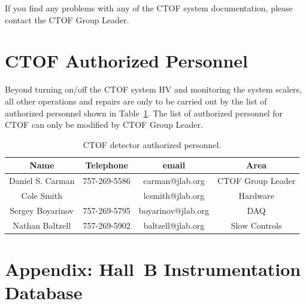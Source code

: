 \documentclass[12pt]{article}
\begin{document}
If you find any problems with any of the CTOF system documentation, please contact the CTOF
Group Leader.

\section{CTOF Authorized Personnel}
\label{personnel}

Beyond turning on/off the CTOF system HV and monitoring the system scalers, all other operations and
repairs are only to be carried out by the list of authorized personnel shown in Table~\ref{expert-list}.
The list of authorized personnel for CTOF can only be modified by CTOF Group Leader.

\begin{table}[htbp]
\begin{center}
\begin{tabular} {|c|c|c|c|} \hline
Name             & Telephone    & email              & Area             \\ \hline \hline
Daniel S. Carman & 757-269-5586 & carman@jlab.org    & CTOF Group Leader\\ \hline
Cole Smith       &              & lcsmith@jlab.org   & Hardware         \\ \hline
Sergey Boyarinov & 757-269-5795 & boyarinov@jlab.org & DAQ              \\ \hline
Nathan Baltzell  & 757-269-5902 & baltzell@jlab.org  & Slow Controls    \\ \hline
\end{tabular}
\caption{CTOF detector authorized personnel.}
\label{expert-list}
\end{center}
\end{table}

\clearpage

\vfil
\eject

\section{Appendix: Hall~B Instrumentation Database}
\end{document}
